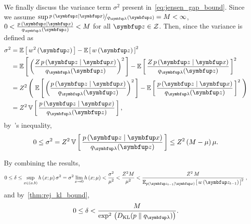 \begin{proofEnd}
We finally discuss the variance term \(\sigma^2\) present in~\eqref{eq:jensen_gap_bound}.
Since we assume \(\sup \nicefrac{p\,(\vz\mid\vx)}{q_{\vlambda}(\vz)} = M < \infty \), \( 0 < \frac{p\,(\vz\mid\vx)}{q_{\vlambda}(\vz)} < M \) for all \(\vz \in \mathcal{Z}\).
Then, since the variance is defined as
\begin{align}
    \sigma^2 &= \E{w^2\,(\vz)} - {\E{w\,(\vz)}}^2 \\
             &= \E{ {\left( \frac{Z\,p\,(\vz\mid\vx)}{q_{\vlambda}(\vz) } \right)}^2 } - {\E{\frac{Z\,p\,(\vz\mid\vx)}{q_{\vlambda}(\vz) }}}^2 \\
             &= Z^2 \left(\; \E{ {\left( \frac{p\,(\vz\mid\vx)}{q_{\vlambda}(\vz) } \right)}^2 } - {\E{\frac{p\,(\vz\mid\vx)}{q_{\vlambda}(\vz) }}}^2 \;\right) \\
             &= Z^2 \, \V{ \frac{p\,(\vz\mid\vx)}{q_{\vlambda}(\vz) } } ,
\end{align}
by~\citet{bhatia_better_2000}'s inequality,
\begin{equation}
    0 \leq \sigma^2 
    = Z^2 \, \V{ \frac{p\,(\vz\mid\vx)}{q_{\vlambda}(\vz) } }
    \leq Z^2 \, (M - \mu)\,\mu.
\end{equation}

By combining the results, 
\begin{align}
  0 \leq \delta
  \leq \sup_{x \in (a,b)} h\,(x; \mu) \, \sigma^2
  = \sigma^2 \lim_{x \rightarrow 0} h\,(x; \mu) 
  < \frac{\sigma^2}{\mu^2}
  < \frac{Z^2 M }{\mu^2}
  < \frac{
    Z^2 \, M
  }
  {
    {\Esub{p(\vz_{t-1}\mid\vx)}{ w\,(\vz_{t-1}) }}^2 
  }\;,
\end{align}
and by~\cref{thm:rej_kl_bound},
\begin{equation}
  0 \leq \delta < \frac{ M }{ \exp^2\,\big( \DKL{p}{q_{\vlambda}} \big) }.
\end{equation}
\end{proofEnd}

